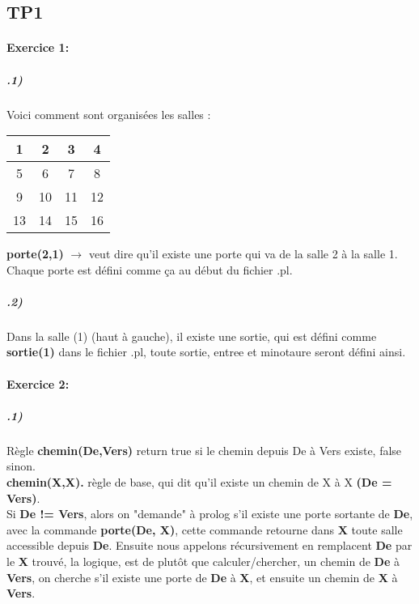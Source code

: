 \documentclass[12pt]
{report}
\newcommand\tab[1][1cm]{\hspace*{#1}}
\begin{document}
\pagestyle{fancy}

\begin{center}
	\section*{\textbf{TP1}}
\end{center}
\bigskip
\paragraph*{\textbf{Exercice 1:}}
\subparagraph*{\textbf{.1)}}

\begin{flushleft}
\tab Voici comment sont organisées les salles :\tab\tab 
\begin{tabular}{|c|c|c|c|}
\hline
1 & 2 & 3 & 4\\
\hline
5 & 6 & 7 & 8\\
\hline
9 & 10 & 11 & 12\\
\hline
13 & 14 & 15 & 16\\
\hline
\end{tabular}
\end{flushleft}
\tab\textbf{porte(2,1)} $\rightarrow$ veut dire qu'il existe une porte qui va de la salle 2 à la salle 1.
\\ \tab Chaque porte est défini comme ça au début du fichier .pl. \\ 

\subparagraph*{\textbf{.2)}} Dans la salle (1) (haut à gauche), il existe une sortie, qui est défini comme \textbf{sortie(1)} dans le fichier .pl, toute sortie, entree et minotaure seront défini ainsi.  


\bigskip
\paragraph*{\textbf{Exercice 2:}}
\subparagraph*{\textbf{.1)}} Règle \textbf{chemin(De,Vers)} return true si le chemin depuis De à Vers existe, false sinon.
\\ \tab \textbf{chemin(X,X).} règle de base, qui dit qu'il existe un chemin de X à X \textbf{(De = Vers)}.
\\ \tab Si \textbf{De != Vers}, alors on "demande" à prolog s'il existe une porte sortante de \textbf{De}, avec la commande \textbf{porte(De, X)}, cette commande retourne dans \textbf{X} toute salle accessible depuis \textbf{De}. Ensuite nous appelons récursivement en remplacent \textbf{De} par le \textbf{X} trouvé, la logique, est de plutôt que calculer/chercher, un chemin de \textbf{De} à \textbf{Vers}, on cherche s'il existe une porte de \textbf{De} à \textbf{X}, et ensuite un chemin de \textbf{X} à \textbf{Vers}.
\end{document}
